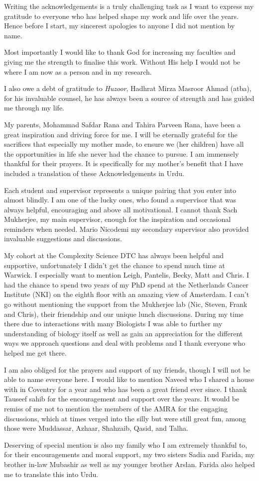 
Writing the acknowledgements is a truly challenging task as I want to express my gratitude to everyone who has helped shape my work and life over the years. Hence before I start, my sincerest apologies to anyone I did not mention by name.

Most importantly I would like to thank God for increasing my faculties and giving me the strength to finalise this work. Without His help I would not be where I am now as a person and in my research.

I also owe a debt of gratitude to \emph{Huzoor}, Hadhrat Mirza Masroor Ahmad (atba), for his invaluable counsel, he has always been a source of strength and has guided me through my life.

My parents, Mohammad Safdar Rana and Tahira Parveen Rana, have been a great inspiration and driving force for me.  I will be eternally grateful for the sacrifices that especially my mother made, to ensure we (her children)  have all the opportunities in life she never had the chance to pursue. I am immensely thankful for their prayers.  It is specifically for my mother's benefit that I have included a translation of these Acknowledgements in Urdu.

Each student and supervisor represents a unique pairing that you enter into almost blindly. I am one of the lucky ones, who found a supervisor that was always helpful, encouraging and above all motivational. I cannot thank Sach Mukherjee, my main supervisor, enough for the inspiration and occasional reminders when needed. Mario Nicodemi my secondary supervisor also provided invaluable suggestions and discussions.

My cohort at the Complexity Science DTC has always been helpful and supportive, unfortunately I didn't get the chance to spend much time at Warwick. I especially want to mention Leigh, Pantelis, Becky, Matt and Chris. I had the chance to spend two years of my PhD spend at the Netherlands Cancer Institute (NKI) on the eighth floor  with an amazing view of Amsterdam. I can't go without mentioning the support from the Mukherjee lab (Nic, Steven, Frank and Chris), their friendship and our unique lunch discussions. During my time there due to interactions with many Biologists I was able to further my understanding of biology itself as well as gain an appreciation for the different ways we approach questions and deal with problems and I thank everyone who helped me get there.

I am also obliged for the prayers and support of my friends, though I will not be able to name everyone here. I would like to mention Naveed who I shared a house with in Coventry for a year and who has been a great friend ever since. I thank Tauseef sahib for the encouragement and support over the years.  It would be remiss of me not to mention the members of the AMRA for the engaging discussions, which at times verged into the silly but were still great fun, among those were Muddassar, Azhaar, Shahzaib, Qasid, and Talha.

Deserving of special mention is also my family who I am extremely thankful to, for their encouragements and moral support, my two sisters Sadia and Farida, my brother in-law Mubashir as well as my younger brother Arslan. Farida also helped me to translate this into Urdu.
